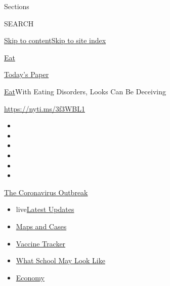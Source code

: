 Sections

SEARCH

\protect\hyperlink{site-content}{Skip to
content}\protect\hyperlink{site-index}{Skip to site index}

\href{https://www.nytimes.com/section/well/eat}{Eat}

\href{https://myaccount.nytimes.com/auth/login?response_type=cookie\&client_id=vi}{}

\href{https://www.nytimes.com/section/todayspaper}{Today's Paper}

\href{/section/well/eat}{Eat}\textbar{}With Eating Disorders, Looks Can
Be Deceiving

\url{https://nyti.ms/3f3WBL1}

\begin{itemize}
\item
\item
\item
\item
\item
\item
\end{itemize}

\href{https://www.nytimes.com/news-event/coronavirus?action=click\&pgtype=Article\&state=default\&region=TOP_BANNER\&context=storylines_menu}{The
Coronavirus Outbreak}

\begin{itemize}
\tightlist
\item
  live\href{https://www.nytimes.com/2020/08/01/world/coronavirus-covid-19.html?action=click\&pgtype=Article\&state=default\&region=TOP_BANNER\&context=storylines_menu}{Latest
  Updates}
\item
  \href{https://www.nytimes.com/interactive/2020/us/coronavirus-us-cases.html?action=click\&pgtype=Article\&state=default\&region=TOP_BANNER\&context=storylines_menu}{Maps
  and Cases}
\item
  \href{https://www.nytimes.com/interactive/2020/science/coronavirus-vaccine-tracker.html?action=click\&pgtype=Article\&state=default\&region=TOP_BANNER\&context=storylines_menu}{Vaccine
  Tracker}
\item
  \href{https://www.nytimes.com/interactive/2020/07/29/us/schools-reopening-coronavirus.html?action=click\&pgtype=Article\&state=default\&region=TOP_BANNER\&context=storylines_menu}{What
  School May Look Like}
\item
  \href{https://www.nytimes.com/live/2020/07/31/business/stock-market-today-coronavirus?action=click\&pgtype=Article\&state=default\&region=TOP_BANNER\&context=storylines_menu}{Economy}
\end{itemize}

